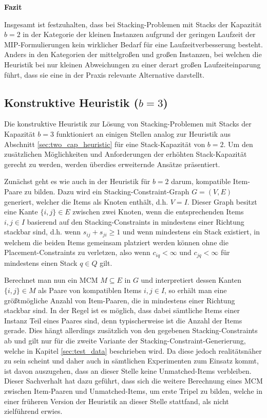 \textbf{Fazit}

Insgesamt ist festzuhalten, dass bei Stacking-Problemen mit Stacks der Kapazität $b = 2$ in der Kategorie der kleinen Instanzen
aufgrund der geringen Laufzeit der MIP-Formulierungen kein wirklicher Bedarf für eine Laufzeitverbesserung besteht.
Anders in den Kategorien der mittelgroßen und großen Instanzen, bei welchen die Heuristik bei nur kleinen Abweichungen zu einer
derart großen Laufzeiteinparung führt, dass sie eine in der Praxis relevante Alternative darstellt.

\subsection{Konstruktive Heuristik ($b = 3$)}
\label{sec:three_cap_heuristic}

Die konstruktive Heuristik zur Lösung von Stacking-Problemen mit Stacks der Kapazität $b = 3$ funktioniert
an einigen Stellen analog zur Heuristik aus Abschnitt \ref{sec:two_cap_heuristic} für eine Stack-Kapazität von $b = 2$.
Um den zusätzlichen Möglichkeiten und Anforderungen der erhöhten Stack-Kapazität gerecht zu werden, werden überdies
erweiternde Ansätze präsentiert.

Zunächst geht es wie auch in der Heuristik für $b = 2$ darum, kompatible Item-Paare zu bilden. Dazu wird ein
Stacking-Constraint-Graph $G = (V, E)$ generiert, welcher die Items als Knoten enthält, d.h. $V = I$.
Dieser Graph besitzt eine Kante $\{i, j\} \in E$ zwischen zwei Knoten, wenn die entsprechenden Items $i, j \in I$
basierend auf den Stacking-Constraints in mindestens einer Richtung stackbar sind, d.h. wenn $s_{ij} + s_{ji} \geq 1$
und wenn mindestens ein Stack existiert, in welchem die beiden Items gemeinsam platziert werden können ohne die Placement-Constraints
zu verletzen, also wenn $c_{iq} < \infty$ und $c_{jq} < \infty$ für mindestens einen Stack $q \in Q$ gilt.

Berechnet man nun ein \textsc{MCM} $M \subseteq E$ in $G$ und interpretiert dessen Kanten $\{i, j\} \in M$ als Paare von kompatiblen Items
$i, j \in I$, so erhält man eine größtmögliche Anzahl von Item-Paaren, die in mindestens einer Richtung stackbar sind. In der Regel ist es möglich, dass dabei sämtliche Items einer Instanz Teil eines Paares sind, denn typischerweise ist die Anzahl der Items gerade.
Dies hängt allerdings zusätzlich von den gegebenen Stacking-Constraints ab und gilt nur für die zweite Variante der Stacking-Constraint-Generierung, welche in Kapitel \ref{sec:test_data} beschrieben wird. Da diese jedoch realitätsnäher zu sein scheint und daher auch in sämtlichen Experimenten zum Einsatz kommt, ist davon auszugehen, dass an dieser Stelle keine Unmatched-Items verbleiben.
Dieser Sachverhalt hat dazu geführt, dass sich die weitere Berechnung eines \textsc{MCM} zwischen Item-Paaren und Unmatched-Items,
um erste Tripel zu bilden, welche in einer früheren Version der Heuristik an dieser Stelle stattfand, als nicht zielführend
erwies.

